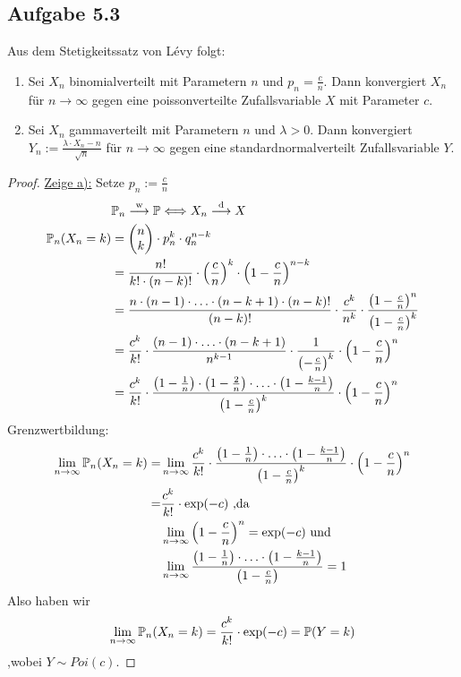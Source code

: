 \subsection{Aufgabe 5.3}
Aus dem Stetigkeitssatz von Lévy folgt:
\begin{enumerate}[label=\alph*)]
	\item Sei $X_n$ binomialverteilt mit Parametern $n$ und $p_n=\frac{c}{n}$.
	Dann konvergiert $X_n$ für $n\to\infty$ gegen eine poissonverteilte Zufallsvariable $X$ mit Parameter $c$.
	\item Sei $X_n$ gammaverteilt mit Parametern $n$ und $\lambda>0$.
	Dann konvergiert $Y_n:=\frac{\lambda\cdot X_n-n}{\sqrt{n}}$ für $n\to\infty$ gegen eine standardnormalverteilt Zufallsvariable $Y$.
\end{enumerate}

\begin{proof}
	\underline{Zeige a):} Setze $p_n:=\frac{c}{n}$
	\begin{align*}
		&\mathbb{P}_n\overset{\text{w}}{\longrightarrow} \mathbb{P}
		\Longleftrightarrow X_n\overset{\mathrm{d}}{\longrightarrow} X\\
		\mathbb{P}_n(X_n=k)&=\begin{pmatrix}
			n\\
			k
		\end{pmatrix}\cdot p_n^k\cdot q_n^{n-k}\\
		&=\frac{n!}{k!\cdot(n-k)!}\cdot\left(\frac{c}{n}\right)^k\cdot\left(1-\frac{c}{n}\right)^{n-k}\\
		&=\frac{n\cdot(n-1)\cdot\ldots\cdot(n-k+1)\cdot(n-k)!}{(n-k)!}\cdot\frac{c^k}{n^k}\cdot\frac{\left(1-\frac{c}{n}\right)^n}{\left(1-\frac{c}{n}\right)^k}\\
		&=\frac{c^k}{k!}\cdot\frac{(n-1)\cdot\ldots\cdot(n-k+1)}{n^{k-1}}\cdot\frac{1}{\left(-\frac{c}{n}\right)^k}\cdot\left(1-\frac{c}{n}\right)^n\\
		&=\frac{c^k}{k!}\cdot\frac{\left(1-\frac{1}{n}\right)\cdot\left(1-\frac{2}{n}\right)\cdot\ldots\cdot\left(1-\frac{k-1}{n}\right)}{\left(1-\frac{c}{n}\right)^k}\cdot\left(1-\frac{c}{n}\right)^n
	\end{align*}
	Grenzwertbildung:
	\begin{align*}
		\lim\limits_{n\to\infty}\mathbb{P}_n(X_n=k)
		=&\lim\limits_{n\to\infty}\frac{c^k}{k!}\cdot\frac{\left(1-\frac{1}{n}\right)\cdot\ldots\cdot\left(1-\frac{k-1}{n}\right)}{\left(1-\frac{c}{n}\right)^k}\cdot\left(1-\frac{c}{n}\right)^n\\
		=&\frac{c^k}{k!}\cdot\exp(-c) \text{ ,da} \\
		 &\lim\limits_{n\to\infty}\left(1-\frac{c}{n}\right)^n=\exp(-c) \text{ und}\\
		&\lim\limits_{n\to\infty}\frac{\left(1-\frac{1}{n}\right)\cdot\ldots\cdot\left(1-\frac{k-1}{n}\right)}{\left(1-\frac{c}{n}\right)}=1
	\end{align*}
	Also haben wir
	\begin{align*}
		\lim\limits_{n\to\infty} \mathbb{P}_n(X_n =k) = \frac{c^k}{k!}\cdot\exp(-c) = \mathbb{P}(Y=k)
	\end{align*}
	,wobei $Y\sim Poi(c)$.
	

\end{proof}
